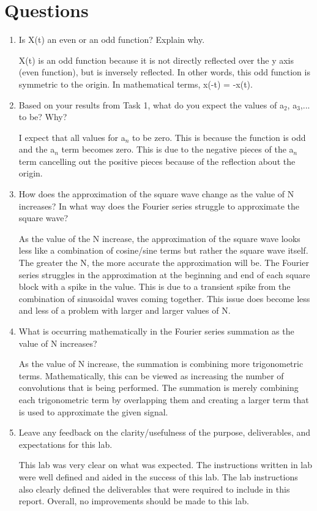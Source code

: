 \documentclass[12pt, titlepage]{article}
\begin{document}
    \section{Questions}
    \begin{enumerate}
        \item Is X(t) an even or an odd function?  Explain why.
        
        X(t) is an odd function because it is not directly reflected over the y axis (even function), but is inversely reflected.  In other words, this odd function is symmetric to the origin. In mathematical terms, x(-t) = -x(t).  
        
        \item Based on your results from Task 1, what do you expect the values of a$_2$, a$_3$,... to be?  Why?
        
        I expect that all values for a$_n$ to be zero.  This is because the function is odd and the a$_n$ term becomes zero.  This is due to the negative pieces of the a$_n$ term cancelling out the positive pieces because of the reflection about the origin.
        
        \item How does the approximation of the square wave change as the value of N increases?  In what way does the Fourier series struggle to approximate the square wave?
        
        As the value of the N increase, the approximation of the square wave looks less like a combination of cosine/sine terms but rather the square wave itself.  The greater the N, the more accurate the approximation will be.  The Fourier series struggles in the approximation at the beginning and end of each square block with a spike in the value.  This is due to a transient spike from the combination of sinusoidal waves coming together.  This issue does become less and less of a problem with larger and larger values of N.
        
        \item What is occurring mathematically in the Fourier series summation as the value of N increases?
        
        As the value of N increase, the summation is combining more trigonometric terms.  Mathematically, this can be viewed as increasing the number of convolutions that is being performed.  The summation is merely combining each trigonometric term by  overlapping them and creating a larger term that is used to approximate the given signal.
        
        \item Leave any feedback on the clarity/usefulness of the purpose, deliverables, and expectations for this lab.
        
        This lab was very clear on what was expected. The instructions written in lab were well defined and aided in the success of this lab. The lab instructions also clearly defined the deliverables that were required to include in this report. Overall, no improvements should be made to this lab.
        
    \end{enumerate}
       
\end{document}

